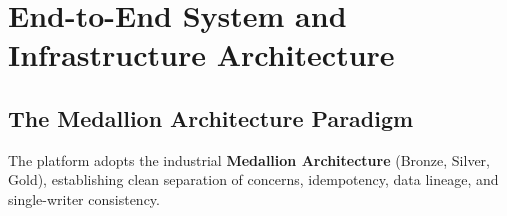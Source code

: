 \documentclass[11pt,a4paper]{article}
\begin{document}
\newpage

\section{End-to-End System and Infrastructure Architecture}

\subsection{The Medallion Architecture Paradigm}
The platform adopts the industrial \textbf{Medallion Architecture} (Bronze, Silver, Gold), establishing clean separation of concerns, idempotency, data lineage, and single-writer consistency.
\end{document}
